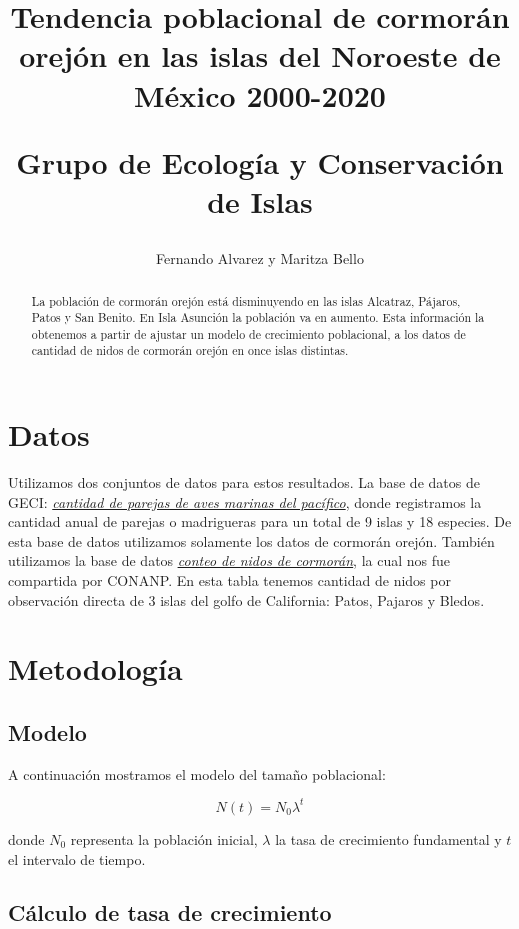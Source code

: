 \documentclass{article} %
\author{Fernando Alvarez y Maritza Bello}
\title{Tendencia poblacional de cormorán orejón en las islas del Noroeste de México 2000-2020\\ \begin{large} Grupo de Ecología y Conservación de Islas \end{large}}
\begin{document}
\maketitle

\begin{abstract}
La población de cormorán orejón está disminuyendo en las islas Alcatraz, Pájaros, Patos y San Benito. En Isla Asunción la población va en aumento. Esta información la obtenemos a partir de ajustar un modelo de crecimiento poblacional, a los datos de cantidad de nidos de cormorán orejón en once islas distintas.

\end{abstract}

\section*{Datos}

Utilizamos dos conjuntos de datos para estos resultados. La base de datos de GECI: \href{https://drive.google.com/drive/u/0/folders/1K2-itQXbNXPhrz4Pb3eRr9NG9A4rR47o}{{\color{blue}\textit{cantidad de parejas de aves marinas del pacífico}}}, donde registramos la cantidad anual de parejas o madrigueras para un total de 9 islas y 18 especies. De esta base de datos utilizamos solamente los datos de cormorán orejón. También utilizamos la base de datos \href{https://drive.google.com/drive/folders/1aXmotwcGcZjK52USWMdlZoffaMUlI0tT}{{\color{blue}\textit{\underline{conteo de nidos de cormorán}}}}, la cual nos fue compartida por CONANP. En esta tabla tenemos cantidad de nidos por observación directa de 3 islas del golfo de California: Patos, Pajaros y Bledos.


\section*{Metodología}
\subsection*{Modelo}
A continuación mostramos el modelo del tamaño poblacional:

\begin{equation}
N(t)=N_{0}\lambda^{t}
\end{equation}

\noindent donde $N_{0}$ representa la población inicial, $\lambda$ la tasa de crecimiento fundamental y $t$ el intervalo de tiempo. 

\subsection*{Cálculo de tasa de crecimiento}
\end{document}
